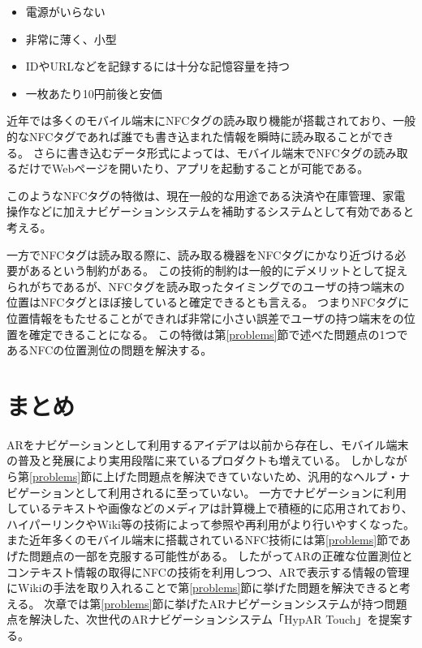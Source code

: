 \begin{itemize}
  \item 電源がいらない
  \item 非常に薄く、小型
  \item IDやURLなどを記録するには十分な記憶容量を持つ
  \item 一枚あたり10円前後と安価
\end{itemize}

近年では多くのモバイル端末にNFCタグの読み取り機能が搭載されており、一般的なNFCタグであれば誰でも書き込まれた情報を瞬時に読み取ることができる。
さらに書き込むデータ形式によっては、モバイル端末でNFCタグの読み取るだけでWebページを開いたり、アプリを起動することが可能である。

このようなNFCタグの特徴は、現在一般的な用途である決済や在庫管理、家電操作などに加えナビゲーションシステムを補助するシステムとして有効であると考える。

一方でNFCタグは読み取る際に、読み取る機器をNFCタグにかなり近づける必要があるという制約がある。
この技術的制約は一般的にデメリットとして捉えられがちであるが、NFCタグを読み取ったタイミングでのユーザの持つ端末の位置はNFCタグとほぼ接していると確定できるとも言える。
つまりNFCタグに位置情報をもたせることができれば非常に小さい誤差でユーザの持つ端末をの位置を確定できることになる。
この特徴は第\ref{problems}節で述べた問題点の1つであるNFCの位置測位の問題を解決する。





\section{まとめ}
ARをナビゲーションとして利用するアイデアは以前から存在し、モバイル端末の普及と発展により実用段階に来ているプロダクトも増えている。
しかしながら第\ref{problems}節に上げた問題点を解決できていないため、汎用的なヘルプ・ナビゲーションとして利用されるに至っていない。
一方でナビゲーションに利用しているテキストや画像などのメディアは計算機上で積極的に応用されており、ハイパーリンクやWiki等の技術によって参照や再利用がより行いやすくなった。
また近年多くのモバイル端末に搭載されているNFC技術には第\ref{problems}節であげた問題点の一部を克服する可能性がある。
したがってARの正確な位置測位とコンテキスト情報の取得にNFCの技術を利用しつつ、ARで表示する情報の管理にWikiの手法を取り入れることで第\ref{problems}節に挙げた問題を解決できると考える。
次章では第\ref{problems}節に挙げたARナビゲーションシステムが持つ問題点を解決した、次世代のARナビゲーションシステム「HypAR Touch」を提案する。
